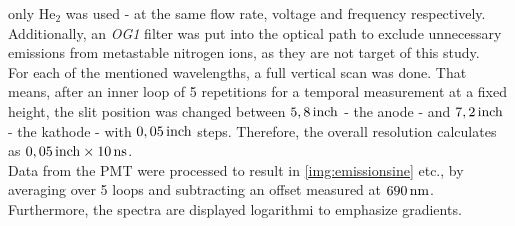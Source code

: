 \documentclass[a4paper,10pt,twoside]{article}
\newcommand{\tilt}[1]{\textit{#1}}
\begin{document}
			\begin{multicols*}{2}
			
				 only He$_2$ was used - at the same flow rate, voltage and frequency respectively. Additionally, an \tilt{OG1} filter was put into the optical path to exclude unnecessary emissions from metastable nitrogen ions, as they are not target of this study.\\
				 For each of the mentioned wavelengths, a full vertical scan was done. That means, after an inner loop of 5 repetitions for a temporal measurement at a fixed height, the slit position was changed between $\unit[5,8]{inch}$ - the anode - and $\unit[7,2]{inch}$ - the kathode - with $\unit[0,05]{inch}$ steps. Therefore, the overall resolution calculates as $\unit[0,05]{inch}\times\unit[10]{ns}$.\\
				 Data from the PMT were processed to result in \autoref{img:emissionsine} etc., by averaging over 5 loops and subtracting an offset measured at $\unit[690]{nm}$. Furthermore, the spectra are displayed logarithmi to emphasize gradients. 
			
			\end{multicols*}
				
		\twocolumn
		
\end{document}
